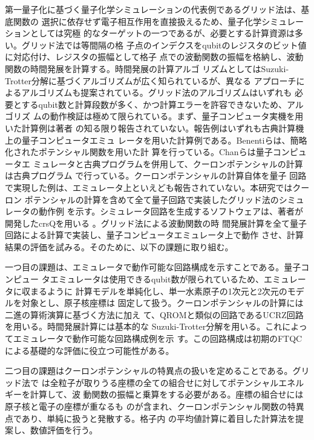 \documentclass[fontsize=11pt]{jlreq}
\begin{document}
第一量子化に基づく量子化学シミュレーションの代表例であるグリッド法は、基底関数の
選択に依存せず電子相互作用を直接扱えるため、量子化学シミュレーションとしては究極
的なターゲットの一つであるが、必要とする計算資源は多い。グリッド法では等間隔の格
子点のインデクスをqubitのレジスタのビット値に対応付け、レジスタの振幅として格子
点での波動関数の振幅を格納し、波動関数の時間発展を計算する。時間発展の計算アルゴ
リズムとしてはSuzuki-Trotter分解に基づくアルゴリズムが広く知られているが、異なる
アプローチによるアルゴリズムも提案されている。グリッド法のアルゴリズムはいずれも
必要とするqubit数と計算段数が多く、かつ計算エラーを許容できないため、アルゴリズ
ムの動作検証は極めて限られている。まず、量子コンピュータ実機を用いた計算例は著者
の知る限り報告されていない。報告例はいずれも古典計算機上の量子コンピュータエミュ
レータを用いた計算例である。Benentiらは、簡略化されたポテンシャル関数を用いた計
算を行っている\cite{Benenti2008.10.1119/1.2894532}。Chanらは量子コンピュータエ
ミュレータと古典プログラムを併用して、クーロンポテンシャルの計算は古典プログラム
で行っている\cite{Chan2023.sciadv.abo7484}。クーロンポテンシャルの計算自体を量子
回路で実現した例は、エミュレータ上といえども報告されていない。本研究ではクーロン
ポテンシャルの計算を含めて全て量子回路で実装したグリッド法のシミュレータの動作例
を示す。シミュレータ回路を生成するソフトウェアは、著者が開発したcrsQを用いる
\cite{takahashi2024.doi:10.1021/acs.jctc.4c00708}。グリッド法による波動関数の時
間発展計算を全て量子回路による計算で実装し、量子コンピュータエミュレータ上で動作
させ、計算結果の評価を試みる。そのために、以下の課題に取り組む。

一つ目の課題は、エミュレータで動作可能な回路構成を示すことである。量子コンピュー
タエミュレータは使用できるqubit数が限られているため、エミュレータに収まるように
計算モデルを単純化し、単一水素原子の1次元と2次元のモデルを対象とし、原子核座標は
固定して扱う。クーロンポテンシャルの計算には二進の算術演算に基づく方法に加え
て、QROMと類似の回路であるUCRZ回路を用いる。時間発展計算には基本的な
Suzuki-Trotter分解を用いる。これによってエミュレータで動作可能な回路構成例を示
す。この回路構成は初期のFTQCによる基礎的な評価に役立つ可能性がある。

二つ目の課題はクーロンポテンシャルの特異点の扱いを定めることである。グリッド法で
は全粒子が取りうる座標の全ての組合せに対してポテンシャルエネルギーを計算して、波
動関数の振幅と乗算をする必要がある。座標の組合せには原子核と電子の座標が重なるも
のが含まれ、クーロンポテンシャル関数の特異点であり、単純に扱うと発散する。格子内
の平均値計算に着目した計算法を提案し、数値評価を行う。
\end{document}
